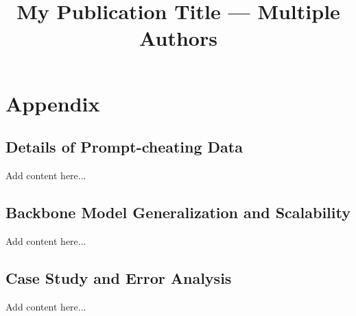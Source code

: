 \documentclass{article} %
\title{My Publication Title --- Multiple Authors}
\begin{document}
\twocolumn
\section*{Appendix}
\setcounter{table}{6}

\subsection*{Details of Prompt-cheating Data}
Add content here...

\subsection*{Backbone Model Generalization and Scalability}
Add content here...

\subsection{Case Study and Error Analysis}
Add content here...
\end{document}
